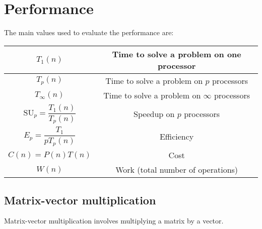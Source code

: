\section{Performance}

The main values used to evaluate the performance are: 
\renewcommand*{\arraystretch}{2}
\begin{table}[H]
    \centering
    \begin{tabular}{|c|c|}
    \hline
    $T_1(n)$ & Time to solve a problem on one processor                  \\ \hline
    $T_p(n)$ & Time to solve a problem on $p$ processors                    \\ \hline
    $T_{\infty}(n)$ & Time to solve a problem on $\infty$ processors        \\ \hline
    $\text{SU}_p = \dfrac{T_1(n)}{T_p(n)}$ & Speedup on $p$ processors    \\ \hline
    $E_p = \dfrac{T_1}{p T_p(n)}$ & Efficiency                               \\ \hline
    $C(n) = P(n) T(n)$ & Cost                                               \\ \hline
    $W(n)$ & Work (total number of operations)                               \\ \hline
    \end{tabular}
\end{table}
\renewcommand*{\arraystretch}{1}

\subsection{Matrix-vector multiplication}
Matrix-vector multiplication involves multiplying a matrix by a vector.

